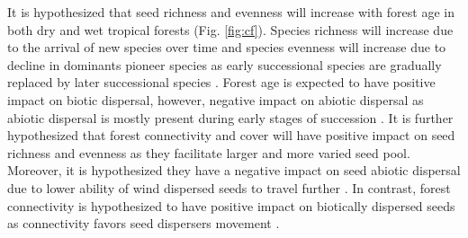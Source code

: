 
It is hypothesized that seed richness and evenness will increase with forest age in both dry and wet tropical forests (Fig. \ref{fig:cf}). Species richness will increase due to the arrival of new species over time and species evenness will increase due to decline in dominants pioneer species as early successional species are gradually replaced by later successional species \citep{poorterSuccessionalTheories2023, chazdonNaturalRegenerationTool2016}. Forest age is expected to have positive impact on biotic dispersal, however, negative impact on abiotic dispersal as abiotic dispersal is mostly present during early stages of succession \citep{dentUnitingNicheDifferentiation2021}. It is further hypothesized that forest connectivity and cover will have positive impact on seed richness and evenness as they facilitate larger and more varied seed pool. Moreover, it is hypothesized they have a negative impact on seed abiotic dispersal due to lower ability of wind dispersed seeds to travel further \citep{vieiraPrinciplesNaturalRegeneration2006}. In contrast, forest connectivity is hypothesized to have positive impact on biotically dispersed seeds as connectivity favors seed dispersers movement \citep{dentUnitingNicheDifferentiation2021}. 


